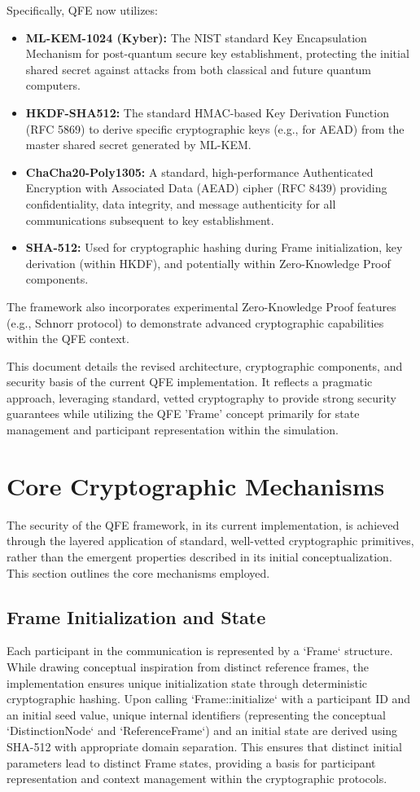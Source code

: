 \documentclass[11pt]{article}
\begin{document}
	Specifically, QFE now utilizes:
	\begin{itemize}
		\item \textbf{ML-KEM-1024 (Kyber):} The NIST standard Key Encapsulation Mechanism for post-quantum secure key establishment, protecting the initial shared secret against attacks from both classical and future quantum computers.
		\item \textbf{HKDF-SHA512:} The standard HMAC-based Key Derivation Function (RFC 5869) to derive specific cryptographic keys (e.g., for AEAD) from the master shared secret generated by ML-KEM.
		\item \textbf{ChaCha20-Poly1305:} A standard, high-performance Authenticated Encryption with Associated Data (AEAD) cipher (RFC 8439) providing confidentiality, data integrity, and message authenticity for all communications subsequent to key establishment.
		\item \textbf{SHA-512:} Used for cryptographic hashing during Frame initialization, key derivation (within HKDF), and potentially within Zero-Knowledge Proof components.
	\end{itemize}
	The framework also incorporates experimental Zero-Knowledge Proof features (e.g., Schnorr protocol) to demonstrate advanced cryptographic capabilities within the QFE context.
	
	This document details the revised architecture, cryptographic components, and security basis of the current QFE implementation. It reflects a pragmatic approach, leveraging standard, vetted cryptography to provide strong security guarantees while utilizing the QFE 'Frame' concept primarily for state management and participant representation within the simulation.
	
	\section{Core Cryptographic Mechanisms}
	
	The security of the QFE framework, in its current implementation, is achieved through the layered application of standard, well-vetted cryptographic primitives, rather than the emergent properties described in its initial conceptualization. This section outlines the core mechanisms employed.
	
	\subsection{Frame Initialization and State}
	Each participant in the communication is represented by a `Frame` structure. While drawing conceptual inspiration from distinct reference frames, the implementation ensures unique initialization state through deterministic cryptographic hashing. Upon calling `Frame::initialize` with a participant ID and an initial seed value, unique internal identifiers (representing the conceptual `DistinctionNode` and `ReferenceFrame`) and an initial state are derived using SHA-512 with appropriate domain separation. This ensures that distinct initial parameters lead to distinct Frame states, providing a basis for participant representation and context management within the cryptographic protocols.
	
\end{document}
